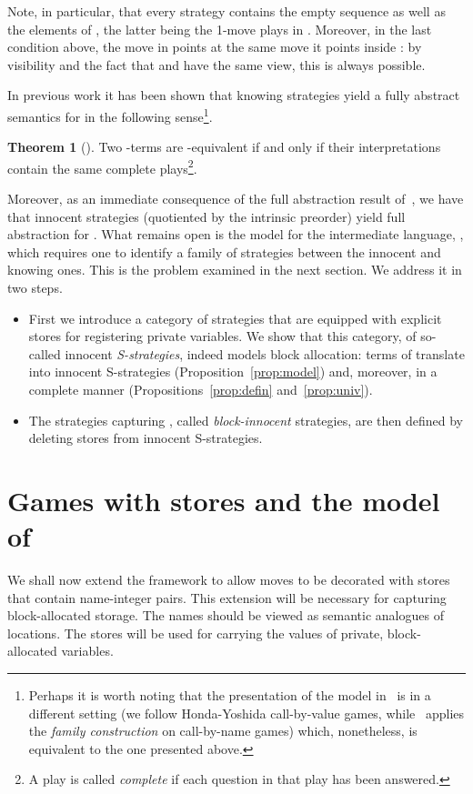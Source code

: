 \documentclass{CSML}
\theoremstyle{definition}\newtheorem{definition}[thm]{Definition}
\theoremstyle{definition}\newtheorem{example}[thm]{Example}
\theoremstyle{definition}\newtheorem{proposition}[thm]{Proposition}
\theoremstyle{definition}\newtheorem{lemma}[thm]{Lemma}
\theoremstyle{definition}\newtheorem{theorem}[thm]{Theorem}
\theoremstyle{definition}\newtheorem{corollary}[thm]{Corollary}
\theoremstyle{definition}\newtheorem{remark}[thm]{Remark}
\newcommand\nt[1]{#1}
\begin{document}
Note, in particular, that every strategy  contains the empty sequence  as well as the elements of , the latter being the 1-move plays in .
\nt{Moreover, in the last condition above, the move  in  points at the same move it points inside : by visibility and the fact that  and  have the same view, this is always possible.}

{In previous work it has been shown that knowing strategies yield a fully abstract semantics for  in the following sense\footnote{Perhaps it is worth noting that the presentation of the model in~\cite{AM97b} is in a different setting
  (we follow Honda-Yoshida call-by-value games, while~\cite{AM97b} applies the \emph{family construction} on call-by-name games) which, nonetheless, is equivalent to the one presented above.}.
  \nt{
  \begin{theorem}[\cite{AM97b}]
Two -terms are -equivalent
  if and only if their interpretations contain the same complete plays\footnote{A play is called \emph{complete} if each question in that play has been answered.}. 
  \end{theorem}
Moreover, as an immediate consequence of the full abstraction result of~\cite{HY97}, we have that innocent strategies (quotiented by the intrinsic preorder)
yield full abstraction for .}
What remains open is the model for the intermediate language, , which requires one to identify a family of strategies between the innocent and knowing ones.
This is the problem examined in the next section. We address it in two steps.
\begin{itemize}
\item First we introduce a category of strategies that are equipped with explicit stores for registering private variables. 
We show that this category, of so-called innocent \emph{S-strategies}, indeed models block allocation: terms of  translate into innocent S-strategies (Proposition~\ref{prop:model}) and, moreover, in a complete manner (Propositions~\ref{prop:defin} and~\ref{prop:univ}). 
\item The strategies capturing , called \emph{block-innocent} strategies, are then defined by deleting stores from innocent S-strategies.
\end{itemize}
}

\section{Games with stores and the model of \texorpdfstring{}{IAcbv}}

We shall now extend the framework to allow moves to be decorated with
stores that contain name-integer pairs. 
This extension will be necessary for capturing block-allocated storage.
The names should be viewed as semantic analogues of locations.
The stores will be used for carrying the values of private, block-allocated variables.
\end{document}
